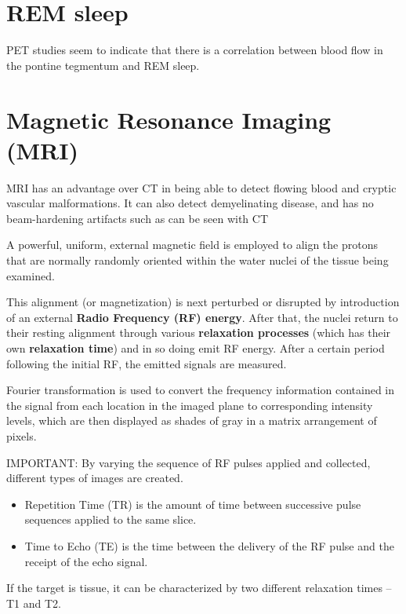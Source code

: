\section{REM sleep}
\label{sec:REM_sleep}

PET studies seem to indicate that there is a correlation between blood flow in
the pontine tegmentum and REM sleep.

\section{Magnetic Resonance Imaging (MRI)}
\label{sec:MRI}

MRI has an advantage over CT in being able to detect flowing blood and cryptic
vascular malformations. It can also detect demyelinating disease, and has no
beam-hardening artifacts such as can be seen with CT

A powerful, uniform, external magnetic field is employed to align the protons
that are normally randomly oriented within the water nuclei of the tissue being
examined.

This alignment (or magnetization) is next perturbed or disrupted by introduction
of an external {\bf Radio Frequency (RF) energy}. After that, the nuclei return
to their resting alignment through various {\bf relaxation processes} (which has
their own {\bf relaxation time}) and in so doing emit RF energy. After a certain
period following the initial RF, the emitted signals are measured.

Fourier transformation is used to convert the frequency information contained in
the signal from each location in the imaged plane to corresponding intensity
levels, which are then displayed as shades of gray in a matrix arrangement of
pixels.

IMPORTANT: By varying the sequence of RF pulses applied and collected, different
types of images are created.
\begin{itemize}
  
  \item Repetition Time (TR) is the amount of time between successive pulse sequences applied to the same slice. 
  
  \item Time to Echo (TE) is the time between the delivery of the RF pulse and the receipt of the echo signal.
\end{itemize}

If the target is tissue, it can be characterized by two different relaxation
times – T1 and T2. 

